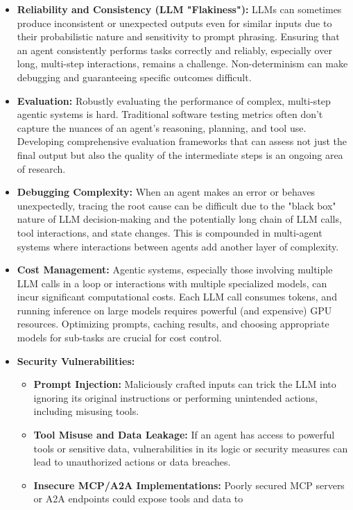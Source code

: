 \begin{itemize}
    \item \textbf{Reliability and Consistency (LLM "Flakiness"):} LLMs can sometimes produce inconsistent or unexpected outputs even for 
    similar inputs due to their probabilistic nature and sensitivity to prompt phrasing. Ensuring that an agent consistently performs tasks 
    correctly and reliably, especially over long, multi-step interactions, remains a challenge. Non-determinism can make debugging and 
    guaranteeing specific outcomes difficult.
    \item \textbf{Evaluation:} Robustly evaluating the performance of complex, multi-step agentic systems is hard. Traditional software 
    testing metrics often don't capture the nuances of an agent's reasoning, planning, and tool use. Developing comprehensive evaluation 
    frameworks that can assess not just the final output but also the quality of the intermediate steps is an ongoing area of research.
    \item \textbf{Debugging Complexity:} When an agent makes an error or behaves unexpectedly, tracing the root cause can be difficult 
    due to the "black box" nature of LLM decision-making and the potentially long chain of LLM calls, tool interactions, and state changes.
     This is compounded in multi-agent systems where interactions between agents add another layer of complexity.
    \item \textbf{Cost Management:} Agentic systems, especially those involving multiple LLM calls in a loop or interactions with multiple 
    specialized models, can incur significant computational costs. Each LLM call consumes tokens, and running inference on large models requires 
    powerful (and expensive) GPU resources. Optimizing prompts, caching results, and choosing appropriate models for sub-tasks are crucial for cost control.
    \item \textbf{Security Vulnerabilities:}
    \begin{itemize}
        \item \textbf{Prompt Injection:} Maliciously crafted inputs can trick the LLM into ignoring its original instructions or 
        performing unintended actions, including misusing tools.
        \item \textbf{Tool Misuse and Data Leakage:} If an agent has access to powerful tools or sensitive data, vulnerabilities in
         its logic or security measures can lead to unauthorized actions or data breaches.
        \item \textbf{Insecure MCP/A2A Implementations:} Poorly secured MCP servers or A2A endpoints could expose tools and data to 

\end{itemize}
\end{itemize}
